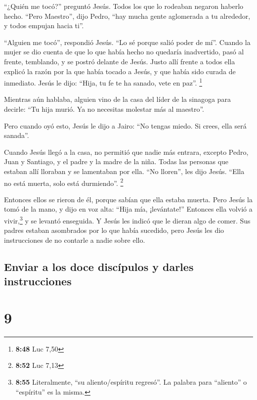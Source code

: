  ``¿Quién me tocó?'' preguntó Jesús. Todos los que lo
rodeaban negaron haberlo hecho. ``Pero Maestro'', dijo Pedro, ``hay
mucha gente aglomerada a tu alrededor, y todos empujan hacia ti''.

 ``Alguien me tocó'', respondió Jesús. ``Lo sé porque
salió poder de mí''.  Cuando la mujer se dio cuenta de
que lo que había hecho no quedaría inadvertido, pasó al frente,
temblando, y se postró delante de Jesús. Justo allí frente a todos ella
explicó la razón por la que había tocado a Jesús, y que había sido
curada de inmediato.  Jesús le dijo: ``Hija, tu fe te ha
sanado, vete en paz''. \footnote{\textbf{8:48} Luc 7,50}

 Mientras aún hablaba, alguien vino de la casa del líder
de la sinagoga para decirle: ``Tu hija murió. Ya no necesitas molestar
más al maestro''.

 Pero cuando oyó esto, Jesús le dijo a Jairo: ``No tengas
miedo. Si crees, ella será sanada''.

 Cuando Jesús llegó a la casa, no permitió que nadie más
entrara, excepto Pedro, Juan y Santiago, y el padre y la madre de la
niña.  Todas las personas que estaban allí lloraban y se
lamentaban por ella. ``No lloren'', les dijo Jesús. ``Ella no está
muerta, solo está durmiendo''. \footnote{\textbf{8:52} Luc 7,13}

 Entonces ellos se rieron de él, porque sabían que ella
estaba muerta.  Pero Jesús la tomó de la mano, y dijo en
voz alta: ``Hija mía, ¡levántate!''  Entonces ella volvió
a vivir,\footnote{\textbf{8:55} Literalmente, ``su aliento/espíritu
  regresó''. La palabra para ``aliento'' o ``espíritu'' es la misma.} y
se levantó enseguida. Y Jesús les indicó que le dieran algo de comer.
 Sus padres estaban asombrados por lo que había sucedido,
pero Jesús les dio instrucciones de no contarle a nadie sobre ello.

\hypertarget{enviar-a-los-doce-discuxedpulos-y-darles-instrucciones}{%
\subsection{Enviar a los doce discípulos y darles
instrucciones}\label{enviar-a-los-doce-discuxedpulos-y-darles-instrucciones}}

\hypertarget{section-8}{%
\section{9}\label{section-8}}

